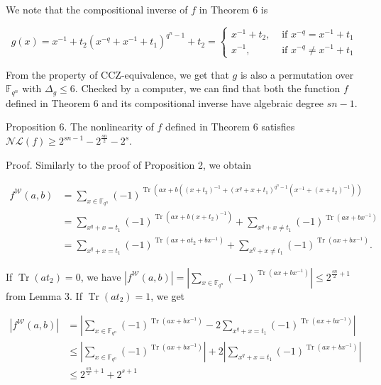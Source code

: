 \documentclass[10pt]{article}
\begin{document}
We note that the compositional inverse of $f$ in Theorem 6 is

$$
g(x)=x^{-1}+t_{2}\left(x^{-q}+x^{-1}+t_{1}\right)^{q^{n}-1}+t_{2}= \begin{cases}x^{-1}+t_{2}, & \text { if } x^{-q}=x^{-1}+t_{1} \\ x^{-1}, & \text { if } x^{-q} \neq x^{-1}+t_{1}\end{cases}
$$

From the property of CCZ-equivalence, we get that $g$ is also a permutation over $\mathbb{F}_{q^{n}}$ with $\Delta_{g} \leqslant 6$. Checked by a computer, we can find that both the function $f$ defined in Theorem 6 and its compositional inverse have algebraic degree $s n-1$.

Proposition 6. The nonlinearity of $f$ defined in Theorem 6 satisfies $\mathcal{N} \mathcal{L}(f) \geqslant 2^{s n-1}-2^{\frac{s n}{2}}-2^{s}$.

Proof. Similarly to the proof of Proposition 2, we obtain

$$
\begin{aligned}
f^{\mathcal{W}}(a, b) & =\sum_{x \in \mathbb{F}_{q^{n}}}(-1)^{\operatorname{Tr}\left(a x+b\left(\left(x+t_{2}\right)^{-1}+\left(x^{q}+x+t_{1}\right)^{q^{n}-1}\left(x^{-1}+\left(x+t_{2}\right)^{-1}\right)\right)\right.} \\
& =\sum_{x^{q}+x=t_{1}}(-1)^{\operatorname{Tr}\left(a x+b\left(x+t_{2}\right)^{-1}\right)}+\sum_{x^{q}+x \neq t_{1}}(-1)^{\operatorname{Tr}\left(a x+b x^{-1}\right)} \\
& =\sum_{x^{q}+x=t_{1}}(-1)^{\operatorname{Tr}\left(a x+a t_{2}+b x^{-1}\right)}+\sum_{x^{q}+x \neq t_{1}}(-1)^{\operatorname{Tr}\left(a x+b x^{-1}\right)} .
\end{aligned}
$$

If $\operatorname{Tr}\left(a t_{2}\right)=0$, we have $\left|f^{\mathcal{W}}(a, b)\right|=\left|\sum_{x \in \mathbb{F}_{q^{n}}}(-1)^{\operatorname{Tr}\left(a x+b x^{-1}\right)}\right| \leqslant 2^{\frac{s n}{2}+1}$ from Lemma 3. If $\operatorname{Tr}\left(a t_{2}\right)=1$, we get

$$
\begin{aligned}
\left|f^{\mathcal{W}}(a, b)\right| & =\left|\sum_{x \in \mathbb{F}_{q^{n}}}(-1)^{\operatorname{Tr}\left(a x+b x^{-1}\right)}-2 \sum_{x^{q}+x=t_{1}}(-1)^{\operatorname{Tr}\left(a x+b x^{-1}\right)}\right| \\
& \leqslant\left|\sum_{x \in \mathbb{F}_{q^{n}}}(-1)^{\operatorname{Tr}\left(a x+b x^{-1}\right)}\right|+2\left|\sum_{x^{q}+x=t_{1}}(-1)^{\operatorname{Tr}\left(a x+b x^{-1}\right)}\right| \\
& \leqslant 2^{\frac{s n}{2}+1}+2^{s+1}
\end{aligned}
$$
\end{document}
